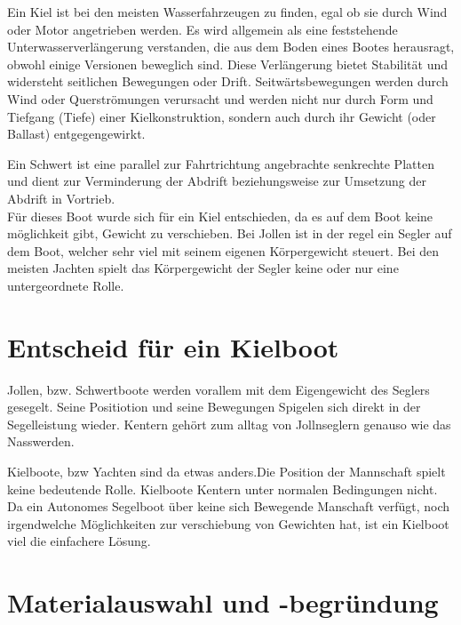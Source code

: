 Ein Kiel ist bei den meisten Wasserfahrzeugen zu finden, egal ob sie durch Wind oder Motor angetrieben werden. Es wird allgemein als eine feststehende Unterwasserverlängerung verstanden, die aus dem Boden eines Bootes herausragt, obwohl einige Versionen beweglich sind. Diese Verlängerung bietet Stabilität und widersteht seitlichen Bewegungen oder Drift. Seitwärtsbewegungen werden durch Wind oder Querströmungen verursacht und werden nicht nur durch Form und Tiefgang (Tiefe) einer Kielkonstruktion, sondern auch durch ihr Gewicht (oder Ballast) entgegengewirkt. 

Ein Schwert ist eine parallel zur Fahrtrichtung angebrachte senkrechte Platten und dient zur Verminderung der Abdrift beziehungsweise zur Umsetzung der Abdrift in Vortrieb. 
\\
Für dieses Boot wurde sich für ein Kiel entschieden, da es auf dem Boot keine möglichkeit gibt, Gewicht zu verschieben. Bei Jollen ist in der regel ein Segler auf dem Boot, welcher sehr viel mit seinem eigenen Körpergewicht steuert. Bei den meisten Jachten spielt das Körpergewicht der Segler keine oder nur eine untergeordnete Rolle.



\section{Entscheid für ein Kielboot}
Jollen, bzw. Schwertboote werden vorallem mit dem Eigengewicht des Seglers gesegelt. Seine Positiotion und seine Bewegungen Spigelen sich direkt in der Segelleistung wieder. Kentern gehört zum alltag von Jollnseglern genauso wie das Nasswerden.

Kielboote, bzw Yachten sind da etwas anders.Die Position der Mannschaft spielt keine bedeutende Rolle. Kielboote Kentern unter normalen Bedingungen nicht. Da ein Autonomes Segelboot über keine sich Bewegende Manschaft verfügt, noch irgendwelche Möglichkeiten zur verschiebung von Gewichten hat, ist ein Kielboot viel die einfachere Lösung.








\section{Materialauswahl und -begründung }
